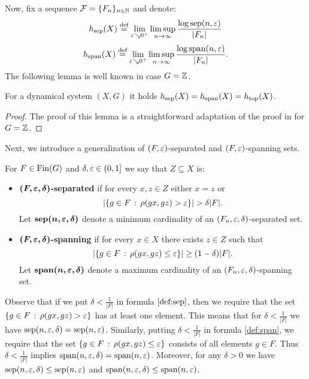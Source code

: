 Now, fix a \Folner sequence $\mathcal F=\{F_n\}_{n\in\mathbb{N}}$ and denote:
\begin{equation}\label{eq:hsep}
h_{\mathrm{sep}}(X)\stackrel{\textup{def}}{=}\lim\limits_{\varepsilon\searrow 0^+}\limsup\limits_{n\to\infty}\frac{\log \operatorname{sep}(n,\varepsilon)}{|F_n|}
\end{equation}
\[
h_{\mathrm{span}}(X)\stackrel{\textup{def}}{=}\lim\limits_{\varepsilon\searrow 0^+}\limsup\limits_{n\to\infty}\frac{\log \operatorname{span}(n,\varepsilon)}{|F_n|}.
\]
The following lemma is well known in case $G=\mathbb{Z}$.
\begin{lem}
For a dynamical system $(X,G)$ it holds $h_{\mathrm{sep}}(X)=h_{\mathrm{span}}(X)=h_\mathrm{top}(X)$.
\end{lem}
\begin{proof}
The proof of this lemma is a straightforward adaptation of the proof in \cite{Downarowicz11} for $G=\mathbb{Z}$.
\end{proof}

Next, we introduce a generalization of $(F,\varepsilon)$-separated and $(F,\varepsilon)$-spanning sets.
\begin{defn}
For $F\in\operatorname{Fin}(G)$  and $\delta, \varepsilon\in(0,1]$ we say that $Z\subseteq X$ is:
\begin{itemize}
\item {\bf$\bm{(F,\varepsilon,\delta)}$-separated} if for every $x,z\in Z$ either $x=z$ or
\begin{equation}\label{def:sep}
\inmodul{\inbrace{g\in F\,:\,\rho(gx,gz)>\eps}}>\delta|F|.
\end{equation}
Let $\bm{\sep(n,\eps, \delta)}$ denote a minimum cardinality of an $(F_n, \varepsilon, \delta)$-separated set.
\item {\bf$\bm{(F,\varepsilon,\delta)}$-spanning} if for every $x\in X$ there exists $z\in Z$ such that 
\begin{equation}\label{def:span}
\left|\left\{g\in F\,:\,\rho(gx, gz)\leq\varepsilon\right\}\right|\geq(1-\delta)|F|.
\end{equation}
Let $\bm{\spn(n,\eps,\delta)}$ denote a maximum cardinality of an $(F_n, \varepsilon, \delta)$-spanning set.
\end{itemize}
\end{defn}
\noindent
Observe that if we put $\delta<\frac{1}{|F|}$ in formula $\eqref{def:sep}$, then we require that the set $\left\{g\in F\,:\,\rho(gx,gz)>\varepsilon\right\}$ has at least one element. This means that for $\delta<\frac{1}{|F|}$ we have $\operatorname{sep}(n,\varepsilon,\delta)=\operatorname{sep}(n,\varepsilon)$.    Similarly, putting $\delta<\frac{1}{|F|}$ in formula \eqref{def:span}, we require that the set $\left\{g\in F\,:\,\rho(gx, gz)\leq\varepsilon\right\}$ consists of all elements $g\in F$. Thus 
$\delta<\frac{1}{|F|}$ implies $\operatorname{span}(n,\varepsilon,\delta)=\operatorname{span}(n,\varepsilon)$.  Moreover, for any $\delta>0$ we have $\operatorname{sep}(n,\varepsilon,\delta)\leq\operatorname{sep}(n,\varepsilon)$ and $\operatorname{span}(n,\varepsilon,\delta)\leq\operatorname{span}(n,\varepsilon)$.

